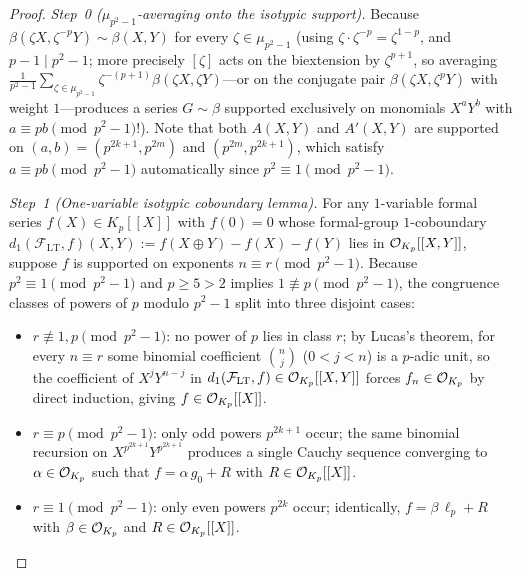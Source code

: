 \begin{proof}
\emph{Step~0 ($\mu_{p^2-1}$-averaging onto the isotypic support).}
Because $\beta(\zeta X, \zeta^{-p} Y) \sim \beta(X, Y)$ for every $\zeta \in \mu_{p^2-1}$ (using $\zeta \cdot \zeta^{-p} = \zeta^{1-p}$, and $p-1 \mid p^2-1$; more precisely $[\zeta]$ acts on the biextension by $\zeta^{p+1}$, so averaging $\frac{1}{p^2-1}\sum_{\zeta \in \mu_{p^2-1}} \zeta^{-(p+1)}\beta(\zeta X, \zeta Y)$—or on the conjugate pair $\beta(\zeta X, \zeta^p Y)$ with weight $1$—produces a series $G \sim \beta$ supported exclusively on monomials $X^a Y^b$ with $a \equiv p b \pmod{p^2 - 1}$!). Note that both $A(X, Y)$ and $A'(X, Y)$ are supported on $(a, b) = (p^{2k+1}, p^{2m})$ and $(p^{2m}, p^{2k+1})$, which satisfy $a \equiv p b \pmod{p^2 - 1}$ automatically since $p^2 \equiv 1 \pmod{p^2 - 1}$.

\emph{Step~1 (One-variable isotypic coboundary lemma).}
For any $1$-variable formal series $f(X) \in K_p[[X]]$ with $f(0) = 0$ whose formal-group $1$-coboundary $d_1(\mathcal{F}_{\mathrm{LT}}, f)(X, Y) := f(X \oplus Y) - f(X) - f(Y)$ lies in $\mathcal{O}_{K_p}[[X, Y]]$, suppose $f$ is supported on exponents $n \equiv r \pmod{p^2 - 1}$. Because $p^2 \equiv 1 \pmod{p^2 - 1}$ and $p \ge 5 > 2$ implies $1 \not\equiv p \pmod{p^2 - 1}$, the congruence classes of powers of $p$ modulo $p^2 - 1$ split into three disjoint cases:
\begin{itemize}
\item $r \not\equiv 1, p \pmod{p^2 - 1}$: no power of $p$ lies in class $r$; by Lucas's theorem, for every $n \equiv r$ some binomial coefficient $\binom{n}{j}$ ($0 < j < n$) is a $p$-adic unit, so the coefficient of $X^j Y^{n-j}$ in $d_1(\mathcal{F}_{\mathrm{LT}}, f) \in \mathcal{O}_{K_p}[[X, Y]]$ forces $f_n \in \mathcal{O}_{K_p}$ by direct induction, giving $f \in \mathcal{O}_{K_p}[[X]]$.
\item $r \equiv p \pmod{p^2 - 1}$: only odd powers $p^{2k+1}$ occur; the same binomial recursion on $X^{p^{2k+1}} Y^{p^{2k+1}}$ produces a single Cauchy sequence converging to $\alpha \in \mathcal{O}_{K_p}$ such that $f = \alpha\, g_0 + R$ with $R \in \mathcal{O}_{K_p}[[X]]$.
\item $r \equiv 1 \pmod{p^2 - 1}$: only even powers $p^{2k}$ occur; identically, $f = \beta\, \ell_p + R$ with $\beta \in \mathcal{O}_{K_p}$ and $R \in \mathcal{O}_{K_p}[[X]]$.
\end{itemize}


\end{proof}
